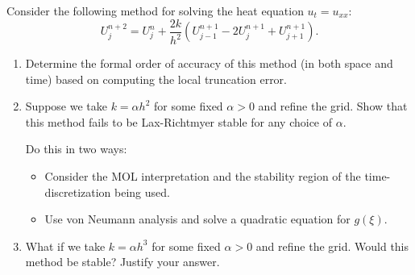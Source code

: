 \documentclass[10pt]{article}
\begin{document}
\maketitle


\begin{problem}[Problem 1]
Consider the following method for solving the heat equation \(u_t = u_{xx}\):
\[
U_j^{n+2} = U_j^n + \frac{2k}{h^2} ( U_{j-1}^{n+1} - 2 U_j^{n+1} + U_{j+1}^{n+1} ) .
\]
\begin{enumerate}[label=(\alph*)]
\item Determine the formal order of accuracy of this method (in both space and time) based on computing the local truncation error.
\item Suppose we take \(k = \alpha h^2\) for some fixed \(\alpha > 0\) and refine the grid.  Show that this method fails to be Lax-Richtmyer stable for any choice of \(\alpha\).

Do this in two ways:
\begin{itemize}
\item Consider the MOL interpretation and the stability region of the time-discretization being used.
\item Use von Neumann analysis and solve a quadratic equation for \(g( \xi )\).
\end{itemize}
\item What if we take \(k = \alpha h^3\) for some fixed \(\alpha > 0\) and refine the grid.  Would this method be stable?  Justify your answer.
\end{enumerate}
\end{problem}
\end{document}
